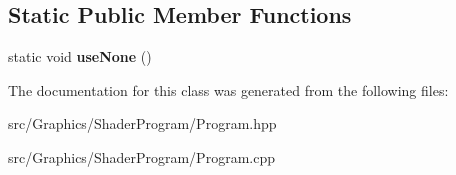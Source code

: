 \subsection*{Static Public Member Functions}
\begin{DoxyCompactItemize}
\item 
\hypertarget{class_program_ae298b93ed2e73fb853b4cae3dbe00bd0}{static void {\bfseries use\+None} ()}\label{class_program_ae298b93ed2e73fb853b4cae3dbe00bd0}

\end{DoxyCompactItemize}


The documentation for this class was generated from the following files\+:\begin{DoxyCompactItemize}
\item 
src/\+Graphics/\+Shader\+Program/Program.\+hpp\item 
src/\+Graphics/\+Shader\+Program/Program.\+cpp\end{DoxyCompactItemize}
